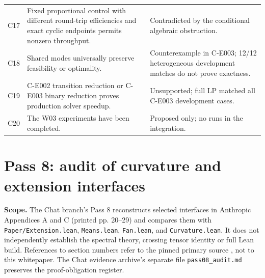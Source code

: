 \documentclass[11pt,letterpaper]{article}
\begin{document}
\begin{longtable}{P{.10\linewidth}P{.46\linewidth}P{.35\linewidth}}
C17 & Fixed proportional control with different round-trip efficiencies and exact cyclic endpoints permits nonzero throughput. & Contradicted by the conditional algebraic obstruction.\\
C18 & Shared modes universally preserve feasibility or optimality. & Counterexample in C-E003; 12/12 heterogeneous development matches do not prove exactness.\\
C19 & C-E002 transition reduction or C-E003 binary reduction proves production solver speedup. & Unsupported; full LP matched all C-E003 development cases.\\
C20 & The W03 experiments have been completed. & Proposed only; no runs in the integration.\\
\bottomrule
\end{longtable}
\endgroup

\section{Pass 8: audit of curvature and extension interfaces}
\label{sec:pass08}
\textbf{Scope.} The Chat branch's Pass 8 reconstructs selected interfaces in Anthropic Appendices A and C (printed pp. 20--29) and compares them with \texttt{Paper/Extension.lean}, \texttt{Means.lean}, \texttt{Fan.lean}, and \texttt{Curvature.lean}. It does not independently establish the spectral theory, crossing tensor identity or full Lean build. References to section numbers refer to the pinned primary source \cite{anthropic}, not to this whitepaper. The Chat evidence archive's separate file \texttt{pass08\_audit.md} preserves the proof-obligation register.
\end{document}
